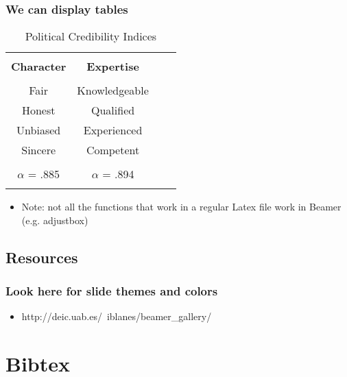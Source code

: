 \documentclass[12pt]{beamer}
\begin{document}
\begin{frame}
\frametitle{We can display tables}
\begin{table} \centering 
 \caption{Political Credibility Indices} 
 \label{} 
 \begin{tabular}{c c c c} 
 \hline \\[-1.8ex] 
 \textbf{Character} & \textbf{Expertise} \\ [0.5ex] 
 \hline \\[-1.8ex] 

 Fair & Knowledgeable  \\ 

Honest & Qualified \\

Unbiased & Experienced  \\

Sincere & Competent  \\

  \hline \\[-1.8ex] 
$\alpha$ = .885 & $\alpha$ = .894\\
 
  \hline \\[-1.8ex] 
\end{tabular}
\end{table}

\begin{itemize} %
	\item Note: not all the functions that work in a regular Latex file work in Beamer (e.g. adjustbox)
\end{itemize}

\end{frame}



\subsection{Resources}

\begin{frame} %
\frametitle{Look here for slide themes and colors} %
\begin{itemize} %
	\item http://deic.uab.es/~iblanes/beamer_gallery/
\end{itemize}
\end{frame} %


\section{Bibtex}
\end{document}
